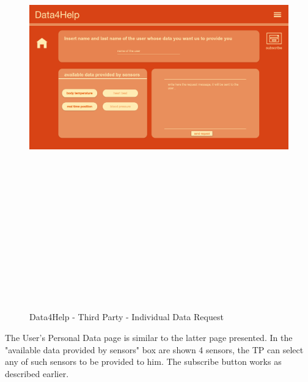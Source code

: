 \begin{figure}[H]
    \includegraphics[width=.6\linewidth, height = 20cm, keepaspectratio]{./Images/Mockups/Data4Help/D4HTP/D4HTP_IndividualDataRequest.png}
    \centering
    \caption{Data4Help - Third Party - Individual Data Request}
    \label{fig:sab}
 \end{figure}
The User's Personal Data page is similar to the latter page presented. In the "available data provided by sensors" box are shown 4 sensors, the TP can select any of such sensors to be provided to him.
The subscribe button works as described earlier. 

